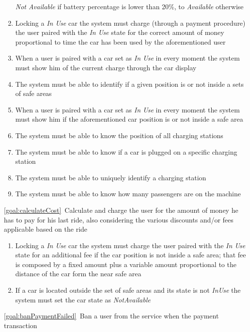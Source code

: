 \begin{description}
\begin{enumerate}[resume*]
  				\emph{Not Available} if battery percentage is lower than 20\%, to \emph{Available}
  				otherwise
  				\item Locking a \emph{In Use} car the system must charge (through a payment
  				procedure) the user paired with the \emph{In Use} state for the correct amount of money
  				proportional to time the car has been used by the aforementioned user
  				\item When a user is paired with a car set as \emph{In Use} in every moment the system
  				must show him of the current charge through the car display 
  				\item The system must be able to identify if a given position is or not inside a sets of safe
  				areas
  				\item When a user is paired with a car set as \emph{In Use} in every moment the system
  				must show him if the aforementioned car position is or not inside a safe area
  				\item The system must be able to know the position of all charging stations
  				\item The system must be able to know if a car is plugged on a specific charging station
  				\item The system must be able to uniquely identify a charging station
  				\item The system must be able to know how many passengers are on the machine	
   			\end{enumerate}
  		\item \ref{goal:calculateCost}\ Calculate and charge the user for the amount of money he has
  		to pay for his last ride, also considering the various discounts and/or fees applicable based on
  		the ride
  			\begin{enumerate}[resume*]
  				\item Locking a \emph{In Use} car the system must charge the user paired with the
  				\emph{In Use} state for an additional fee if the car position is not inside a safe area; that
  				fee is composed by a fixed amount plus a variable amount proportional to the distance of
  				the car form the near safe area
  				\item If a car is located outside the set of safe areas and its state is not \emph{InUse} the
  				system must set the car state as \emph{NotAvailable}
   			\end{enumerate}
   		\item \ref{goal:banPaymentFailed}\ Ban a user from the service when the payment transaction

\end{description}
